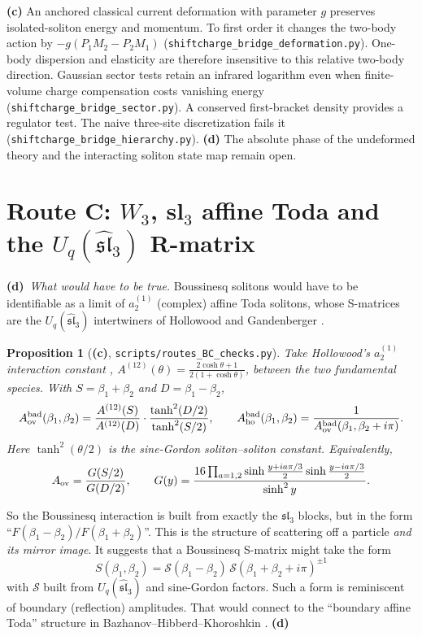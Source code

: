 \documentclass[11pt,a4paper]{article}
\newcommand{\Lc}{\textsf{\textbf{(c)}}\xspace}
\newcommand{\Ld}{\textsf{\textbf{(d)}}\xspace}
\newcommand{\script}[1]{\texttt{scripts/#1}}
\newcommand{\file}[1]{\nolinkurl{#1}}
\newtheorem{proposition}{Proposition}[section]
\theoremstyle{remark}\newtheorem{remark}[proposition]{Remark}
\begin{document}
\Lc An anchored classical current deformation with parameter $g$ preserves
isolated-soliton energy and momentum. To first order it changes the two-body
action by $-g(P_1M_2-P_2M_1)$ (\file{shiftcharge_bridge_deformation.py}).
One-body dispersion and elasticity are therefore insensitive to this relative
two-body direction. Gaussian sector tests retain an infrared logarithm even
when finite-volume charge compensation costs vanishing energy
(\file{shiftcharge_bridge_sector.py}). A conserved first-bracket density
provides a regulator test. The naive three-site discretization fails it
(\file{shiftcharge_bridge_hierarchy.py}). \Ld The absolute phase of the
undeformed theory and the interacting soliton state map remain open.

\section[Route C: affine Toda and the quantum R-matrix]{Route C: $W_3$, sl$_3$ affine Toda and the $U_q(\widehat{\mathfrak{sl}}_3)$ R-matrix}

\Ld\ \emph{What would have to be true.} Boussinesq solitons would have to be identifiable as a limit of $a_2^{(1)}$ (complex) affine Toda solitons, whose S-matrices are the $U_q(\widehat{\mathfrak{sl}}_3)$ intertwiners of Hollowood \cite{Hol93} and Gandenberger \cite{Gand}.

\begin{proposition}[\Lc, \script{routes\_\allowbreak BC\_\allowbreak checks.py}]\label{prop:fact}
Take Hollowood's $a_2^{(1)}$ interaction constant \cite[(1.19)]{Hol92}, $A^{(12)}(\theta)=\frac{2\cosh\theta+1}{2(1+\cosh\theta)}$, between the two fundamental species. With $S=\beta_1+\beta_2$ and $D=\beta_1-\beta_2$,
\[
A^{\rm bad}_{\rm ov}(\beta_1,\beta_2)=\frac{A^{(12)}(S)}{A^{(12)}(D)}\cdot\frac{\tanh^2(D/2)}{\tanh^2(S/2)},\qquad A^{\rm bad}_{\rm ho}(\beta_1,\beta_2)=\frac1{A^{\rm bad}_{\rm ov}(\beta_1,\beta_2+i\pi)} .
\]
Here $\tanh^2(\theta/2)$ is the sine-Gordon soliton--soliton constant. Equivalently,
\[
A_{\rm ov}=\frac{G(S/2)}{G(D/2)},\qquad G(y)=\frac{16\prod_{a=1,2}\sinh\frac{y+ia\pi/3}{2}\sinh\frac{y-ia\pi/3}{2}}{\sinh^2y}.
\]
\end{proposition}

So the Boussinesq interaction is built from exactly the $\mathfrak{sl}_3$ blocks, but in the form ``$F(\beta_1-\beta_2)/F(\beta_1+\beta_2)$''. This is the structure of scattering off a particle \emph{and its mirror image}. It suggests that a Boussinesq S-matrix might take the form
\[
S(\beta_1,\beta_2)=\mathcal S(\beta_1-\beta_2)\,\mathcal S(\beta_1+\beta_2+i\pi)^{\pm1}
\]
with $\mathcal S$ built from $U_q(\widehat{\mathfrak{sl}}_3)$ and sine-Gordon factors. Such a form is reminiscent of boundary (reflection) amplitudes. That would connect to the ``boundary affine Toda'' structure in Bazhanov--Hibberd--Khoroshkin \cite{BHK}. \Ld
\end{document}
